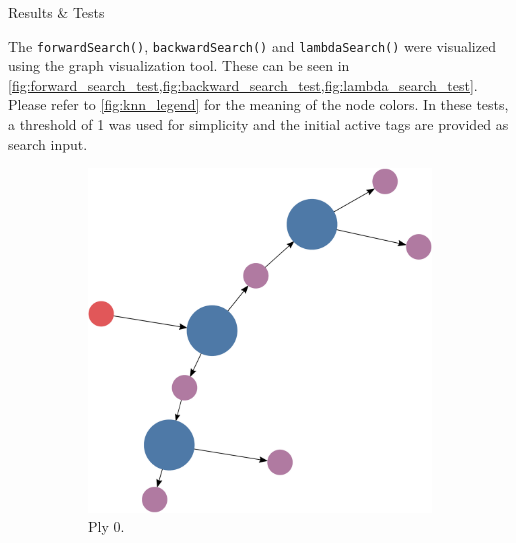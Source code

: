\documentclass[final]{beamer} %
\newcommand{\code}[1]{\texttt{#1}}
\begin{document}
\begin{frame}
\begin{columns}
\begin{column}{.33\textwidth}
{\begin{block}{Results \& Tests}
					\parbox{0.99\textwidth}{The \code{forwardSearch()}, \code{backwardSearch()} and \code{lambdaSearch()} were visualized using the graph visualization tool. These can be seen in \cref{fig:forward_search_test,fig:backward_search_test,fig:lambda_search_test}. Please refer to \cref{fig:knn_legend} for the meaning of the node colors. In these tests, a threshold of 1 was used for simplicity and the initial active tags are provided as search input.}
					
					\begin{figure}
						\begin{subfigure}[!htb]{0.32\columnwidth}
							\centering
							\includegraphics[width=\columnwidth]{figures/knn_simple_forward_think_0.pdf}
							\caption{Ply 0.}
						\end{subfigure}
						\begin{subfigure}[!htb]{0.32\columnwidth}
							\centering

\end{subfigure}
\end{figure}
\end{block}}
\end{column}
\end{columns}
\end{frame}
\end{document}
